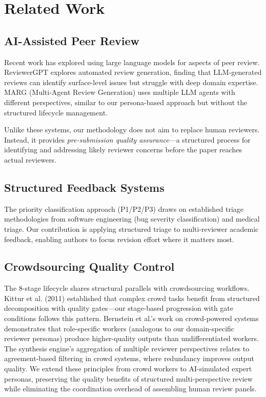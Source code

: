 \section{Related Work}

\subsection{AI-Assisted Peer Review}

Recent work has explored using large language models for aspects of peer review. ReviewerGPT explores automated review generation, finding that LLM-generated reviews can identify surface-level issues but struggle with deep domain expertise. MARG (Multi-Agent Review Generation) uses multiple LLM agents with different perspectives, similar to our persona-based approach but without the structured lifecycle management.

Unlike these systems, our methodology does not aim to replace human reviewers. Instead, it provides \emph{pre-submission quality assurance}---a structured process for identifying and addressing likely reviewer concerns before the paper reaches actual reviewers.

\subsection{Structured Feedback Systems}

The priority classification approach (P1/P2/P3) draws on established triage methodologies from software engineering (bug severity classification) and medical triage. Our contribution is applying structured triage to multi-reviewer academic feedback, enabling authors to focus revision effort where it matters most.

\subsection{Crowdsourcing Quality Control}

The 8-stage lifecycle shares structural parallels with crowdsourcing workflows. Kittur et al. (2011) established that complex crowd tasks benefit from structured decomposition with quality gates---our stage-based progression with gate conditions follows this pattern. Bernstein et al.'s work on crowd-powered systems demonstrates that role-specific workers (analogous to our domain-specific reviewer personas) produce higher-quality outputs than undifferentiated workers. The synthesis engine's aggregation of multiple reviewer perspectives relates to agreement-based filtering in crowd systems, where redundancy improves output quality. We extend these principles from crowd workers to AI-simulated expert personas, preserving the quality benefits of structured multi-perspective review while eliminating the coordination overhead of assembling human review panels.

